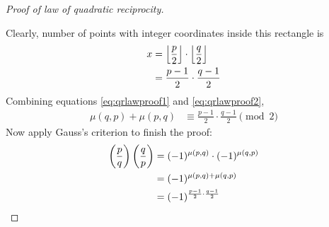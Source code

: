 \begin{proof}[Proof of law of quadratic reciprocity]
\begin{center}
	\end{center}
	Clearly, number of points with integer coordinates inside this rectangle is
	\begin{align}\label{eq:qrlawproof2}
		x
			& =\left\lfloor{\frac{p}{2}}\right\rfloor\cdot \left\lfloor{\frac{q}{2}}\right\rfloor\\
			& = \frac{p-1}{2}\cdot\frac{q-1}{2}
	\end{align}
	Combining equations \eqref{eq:qrlawproof1} and \eqref{eq:qrlawproof2},
	\begin{align*}
		\mu(q,p)+\mu(p,q)
			& \equiv \frac{p-1}{2}\cdot\frac{q-1}{2} \pmod 2
	\end{align*}
	Now apply Gauss's criterion to finish the proof:
	\begin{align*}
		\left(\dfrac{p}{q}\right)\left(\dfrac{q}{p}\right)
			&=(-1)^{\mu(p,q)} \cdot (-1)^{\mu(q,p)} \\
			&= (-1)^{\mu(p,q)+\mu(q,p)}\\
			&=(-1)^{\frac{p-1}{2}\cdot\frac{q-1}{2}}
	\end{align*}
\end{proof}
